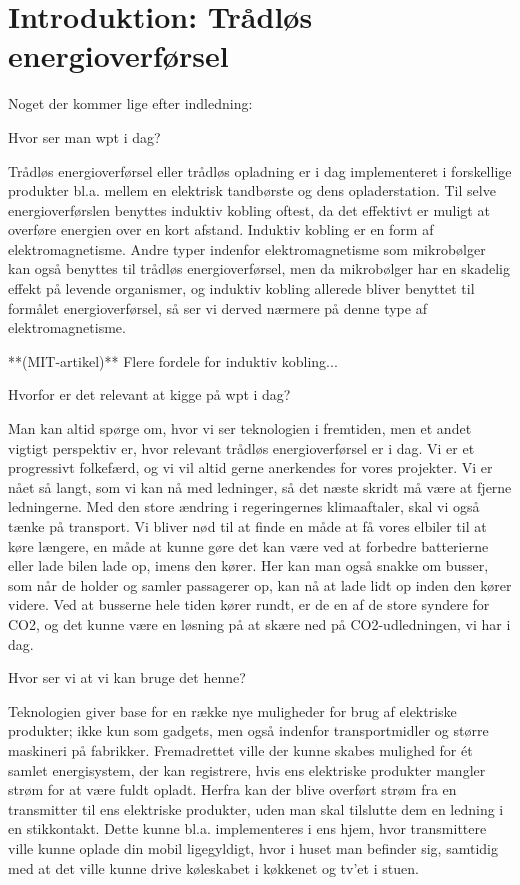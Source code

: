 \section{Introduktion: Trådløs energioverførsel}

Noget der kommer lige efter indledning:

Hvor ser man wpt i dag?

Trådløs energioverførsel eller trådløs opladning er i dag implementeret i forskellige produkter bl.a. mellem en elektrisk tandbørste og dens opladerstation. Til selve energioverførslen benyttes induktiv kobling oftest, da det effektivt er muligt at overføre energien over en kort afstand. Induktiv kobling er en form af elektromagnetisme. Andre typer indenfor elektromagnetisme som mikrobølger kan også benyttes til trådløs energioverførsel, men da mikrobølger har en skadelig effekt på levende organismer, og induktiv kobling allerede bliver benyttet til formålet energioverførsel, så ser vi derved nærmere på denne type af elektromagnetisme.

**(MIT-artikel)** Flere fordele for induktiv kobling...

Hvorfor er det relevant at kigge på wpt i dag?

Man kan altid spørge om, hvor vi ser teknologien i fremtiden, men et andet vigtigt perspektiv er, hvor relevant trådløs energioverførsel er i dag. Vi er et progressivt folkefærd, og vi vil altid gerne anerkendes for vores projekter. Vi er nået så langt, som vi kan nå med ledninger, så det næste skridt må være at fjerne ledningerne. Med den store ændring i regeringernes klimaaftaler, skal vi også tænke på transport. Vi bliver nød til at finde en måde at få vores elbiler til at køre længere, en måde at kunne gøre det kan være ved at forbedre batterierne eller lade bilen lade op, imens den kører. Her kan man også snakke om busser, som når de holder og samler passagerer op, kan nå at lade lidt op inden den kører videre. Ved at busserne hele tiden kører rundt, er de en af de store syndere for CO2, og det kunne være en løsning på at skære ned på CO2-udledningen, vi har i dag.

Hvor ser vi at vi kan bruge det henne?

Teknologien giver base for en række nye muligheder for brug af elektriske produkter; ikke kun som gadgets, men også indenfor transportmidler og større maskineri på fabrikker. Fremadrettet ville der kunne skabes mulighed for ét samlet energisystem, der kan registrere, hvis ens elektriske produkter mangler strøm for at være fuldt opladt. Herfra kan der blive overført strøm fra en transmitter til ens elektriske produkter, uden man skal tilslutte dem en ledning i en stikkontakt. Dette kunne bl.a. implementeres i ens hjem, hvor transmittere ville kunne oplade din mobil ligegyldigt, hvor i huset man befinder sig, samtidig med at det ville kunne drive køleskabet i køkkenet og tv'et i stuen.

